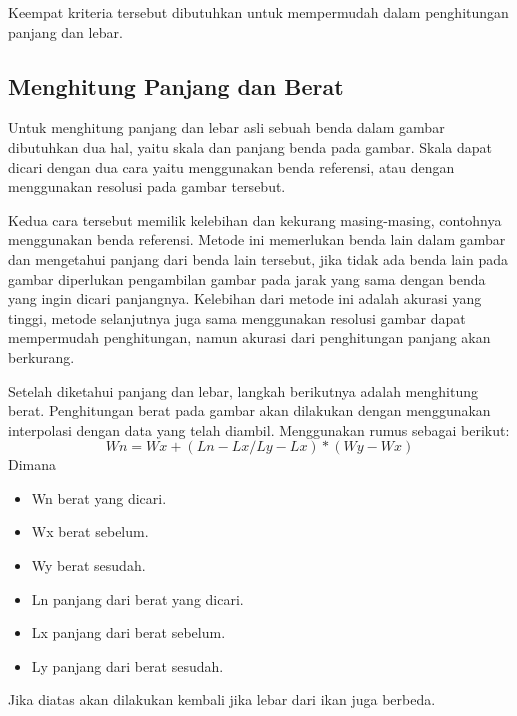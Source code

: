 Keempat kriteria tersebut dibutuhkan untuk mempermudah dalam penghitungan panjang dan lebar.

\newpage
\subsection{\textbf{Menghitung Panjang dan Berat}}
    Untuk menghitung panjang dan lebar asli sebuah benda dalam gambar dibutuhkan dua hal, yaitu skala dan panjang benda pada gambar.
Skala dapat dicari dengan dua cara yaitu menggunakan benda referensi, atau dengan menggunakan resolusi pada gambar tersebut.
    
    Kedua cara tersebut memilik kelebihan dan kekurang masing-masing, contohnya menggunakan benda referensi.
 Metode ini memerlukan benda lain dalam gambar dan mengetahui panjang dari benda lain tersebut, jika tidak ada benda lain pada gambar diperlukan pengambilan gambar pada jarak yang sama dengan benda yang ingin dicari panjangnya.
 Kelebihan dari metode ini adalah akurasi yang tinggi, metode selanjutnya juga sama menggunakan resolusi gambar dapat mempermudah penghitungan, namun akurasi dari penghitungan panjang akan berkurang.

    Setelah diketahui panjang dan lebar, langkah berikutnya adalah menghitung berat. Penghitungan berat pada gambar akan dilakukan dengan menggunakan interpolasi dengan data yang telah diambil. Menggunakan rumus sebagai berikut:
\begin{equation}
    Wn = Wx + (Ln - Lx / Ly - Lx) * (Wy - Wx)
\end{equation}
Dimana 
\begin{itemize} 
    \item Wn berat yang dicari.
    \item Wx berat sebelum.
    \item Wy berat sesudah.
    \item Ln panjang dari berat yang dicari.
    \item Lx panjang dari berat sebelum.
    \item Ly panjang dari berat sesudah.
\end{itemize}
    Jika diatas akan dilakukan kembali jika lebar dari ikan juga berbeda.

